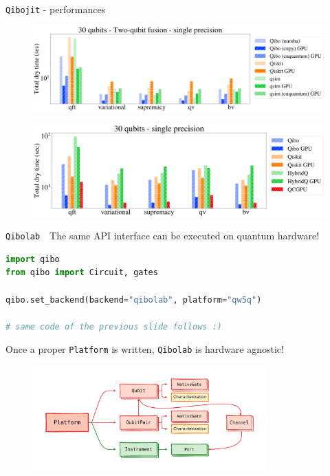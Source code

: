 \documentclass[8pt, xcolor={svgnames}, hyperref={linkcolor=black}]{beamer}
\begin{document}
\begin{frame}{\texttt{Qibojit} - performances}
\begin{figure}
    \centering 
    \includegraphics[width=1\textwidth]{figures/libraries.png}
\end{figure}
\begin{figure}
    \centering 
    \includegraphics[width=1\textwidth]{figures/lib-2.png}
  \end{figure}
\end{frame}

\begin{frame}[fragile]{\texttt{Qibolab}}
\faCog\,\, The same API interface can be executed on quantum hardware!
\pause
\begin{tcolorbox}
\large
\begin{lstlisting}[language=Python]
import qibo
from qibo import Circuit, gates

qibo.set_backend(backend="qibolab", platform="qw5q")

# same code of the previous slide follows :)
\end{lstlisting}
\end{tcolorbox}
\pause
Once a proper \texttt{Platform} is written, \texttt{Qibolab} is hardware agnostic! 
\begin{figure}  
   \includegraphics[width=0.8\textwidth]{figures/Platform_object.pdf}
\end{figure}
\end{frame}
\end{document}
